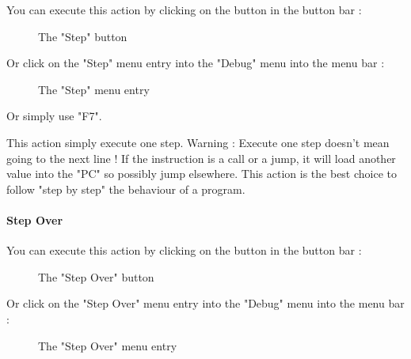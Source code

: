 \documentclass[10pt]{report}
\begin{document}
You can execute this action by clicking on the button in the button bar :\newline
\begin{figure}[H]
\centering
{}
\caption{The "Step" button} 
\end{figure}

Or click on the "Step" menu entry into the "Debug" menu into the menu bar :\newline
\begin{figure}[H]
\centering
{}
\caption{The "Step" menu entry} 
\end{figure}

Or simply use "F7".\newline\newline

This action simply execute one step.\newline
Warning : Execute one step doesn't mean going to the next line !\newline
If the instruction is a call or a jump, it will load another value into the "PC" so possibly jump elsewhere.\newline
This action is the best choice to follow "step by step" the behaviour of a program.\newline

\paragraph{Step Over}

You can execute this action by clicking on the button in the button bar :\newline
\begin{figure}[H]
\centering
{}
\caption{The "Step Over" button} 
\end{figure}

Or click on the "Step Over" menu entry into the "Debug" menu into the menu bar :\newline
\begin{figure}[H]
\centering
{}
\caption{The "Step Over" menu entry} 
\end{figure}
\end{document}
